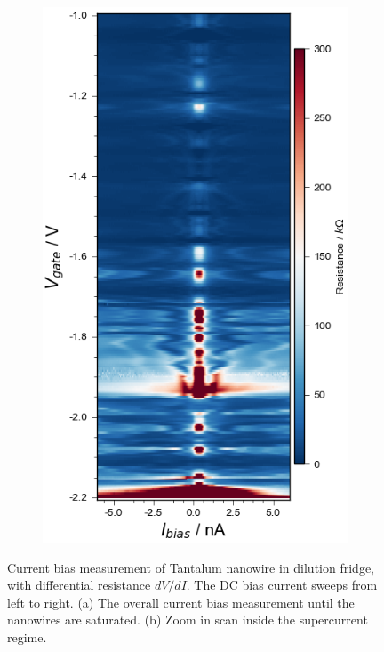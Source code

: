 \begin{figure}[h!]
\begin{subfigure}[b]{0.48\textwidth}
         \caption{}
         \label{}
     \end{subfigure}
     \hfill
     \begin{subfigure}[b]{0.48\textwidth}
         \centering
         \includegraphics[width=\textwidth]{Pic/NW2_finerscan_currentbias_0.png}
         \caption{}
         \label{}
     \end{subfigure}
     \caption{Current bias measurement of Tantalum nanowire in dilution fridge, with differential resistance $dV/dI$. The DC bias current sweeps from left to right. (a) The overall current bias measurement until the nanowires are saturated. (b) Zoom in scan inside the supercurrent regime.}
    \label{Ibiasnw2}
\end{figure}
